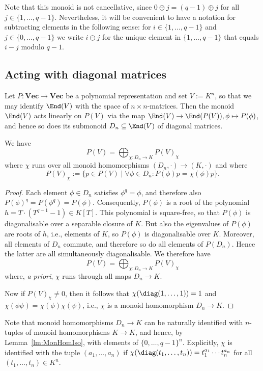 \documentclass{amsart}
\renewcommand{\Vec}{\mathbf{Vec}}
\newcommand{\omin}{\ominus}
\begin{document}
Note that this monoid is not cancellative, since $0 \oplus j = (q-1)
\oplus j$ for all $j \in \{1,\ldots,q-1\}$.  Nevertheless, it will be
convenient to have a notation for subtracting elements in the following
sense: for $i \in \{1,\ldots,q-1\}$ and $j \in \{0,\ldots,q-1\}$ we write
$i \omin j$ for the unique element in $\{1,\ldots,q-1\}$ that equals $i-j$
modulo $q-1$.

\subsection{Acting with diagonal matrices}

Let $P:\Vec \to \Vec$ be a polynomial representation and set $V:=K^n$, so
that we may identify $\End(V)$ with the space of $n \times n$-matrices.
Then the monoid $\End(V)$ acts linearly on $P(V)$ via the map $\End(V)
\to \End(P(V)), \phi \mapsto P(\phi)$, and hence so does its submonoid
$D_n \subseteq \End(V)$ of diagonal matrices.

\begin{lm} \label{lm:KMon}
We have
\[ P(V)=\bigoplus_{\chi:D_n \to K} P(V)_\chi \]
where $\chi$ runs over all monoid homomorphisms $(D_n,\cdot) \to
(K,\cdot)$ and where 
\[ P(V)_\chi:=\{p \in P(V) \mid \forall \phi \in D_n:
P(\phi)p=\chi(\phi)p \}. \]
\end{lm}

\begin{proof}
Each element $\phi \in D_n$ satisfies $\phi^q=\phi$, and therefore
also $P(\phi)^q=P(\phi^q)=P(\phi)$. Consequently, $P(\phi)$ is a root
of the polynomial $h=T\cdot (T^{q-1}-1) \in K[T]$.  This polynomial is
square-free, so that $P(\phi)$ is diagonalisable over a separable closure
of $K$. But also the eigenvalues of $P(\phi)$ are roots of $h$, i.e.,
elements of $K$, so $P(\phi)$ is diagonalisable over $K$.  Moreover,
all elements of $D_n$ commute, and therefore so do all elements of
$P(D_n)$. Hence the latter are all simultaneously diagonalisable.
We therefore have
\[ P(V)=\bigoplus_{\chi:D_n \to K} P(V)_\chi \]
where, {\em a priori}, $\chi$ runs through all maps $D_n \to K$. 

Now if $P(V)_\chi \neq 0$, then it follows that
$\chi(\diag(1,\ldots,1))=1$ and $\chi(\phi
\psi)=\chi(\phi) \chi(\psi)$, i.e., $\chi$ is a monoid homomorphism
$D_n \to K$. 
\end{proof}

Note that monoid homomorphisms $D_n \to K$ can be naturally
identified with $n$-tuples of monoid homomorphisms $K \to K$, and
hence, by Lemma~\ref{lm:MonHomIso}, with elements of $\{0,\ldots,q-1\}^n$.
Explicitly, $\chi$ is identified with the tuple $(a_1,\ldots,a_n)$
if $\chi(\diag(t_1,\ldots,t_n))=t_1^{a_1} \cdots t_n^{a_n}$ for all
$(t_1,\ldots,t_n) \in K^n$.
\end{document}
